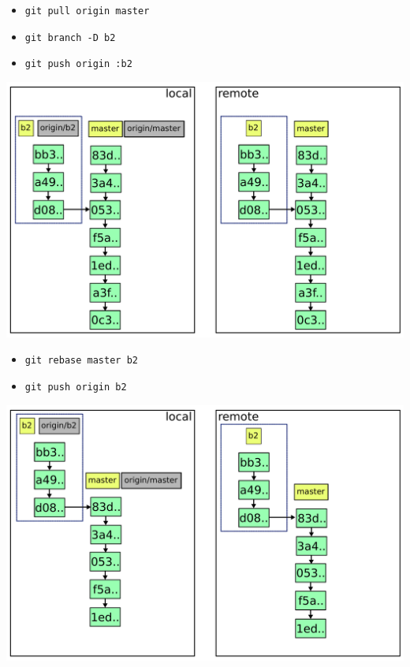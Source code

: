 \documentclass{beamer}
\begin{document}
\begin{frame}{}
  \begin{itemize}
  \item \lstinline|git pull origin master|
  \item \lstinline|git branch -D b2|
  \item \lstinline|git push origin :b2|
  \end{itemize}
\end{frame}

\begin{frame}{}
  \includegraphics[width=\textwidth]{img/8.pdf}
\end{frame}

\begin{frame}{}
  \begin{itemize}
  \item \lstinline|git rebase master b2|
  \item \lstinline|git push origin b2|
  \end{itemize}
\end{frame}

\begin{frame}{}
  \includegraphics[width=\textwidth]{img/9.pdf}
\end{frame}
\end{document}
